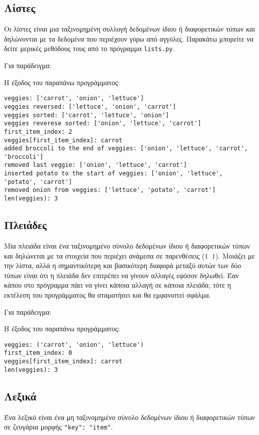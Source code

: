 \documentclass[14pt]{extreport}
\begin{document}
\subsection{Λίστες}
Οι λίστες είναι μια ταξινομημένη συλλογή δεδομένων ίδιου ή διαφορετικών τύπων και δηλώνονται με τα δεδομένα που περιέχουν γύρω από αγγύλες. Παρακάτω μπορείτε να δείτε μερικές μεθόδους τους από το πρόγραμμα \lstinline{lists.py}.

Για παράδειγμα:



Η έξοδος του παραπάνω προγράμματος:

\begin{lstlisting}[language={}]
veggies: ['carrot', 'onion', 'lettuce']
veggies reversed: ['lettuce', 'onion', 'carrot']
veggies sorted: ['carrot', 'lettuce', 'onion']
veggies reverese sorted: ['onion', 'lettuce', 'carrot']
first_item_index: 2
veggies[first_item_index]: carrot
added broccoli to the end of veggies: ['onion', 'lettuce', 'carrot', 'broccoli']
removed last veggie: ['onion', 'lettuce', 'carrot']
inserted potato to the start of veggies: ['onion', 'lettuce', 'potato', 'carrot']
removed onion from veggies: ['lettuce', 'potato', 'carrot']
len(veggies): 3
\end{lstlisting}

\subsection{Πλειάδες}
Μία πλειάδα είναι ένα ταξινομημένο σύνολο δεδομένων ίδιου ή διαφορετικών τύπων και δηλώνεται με τα στοιχεία που περιέχει ανάμεσα σε παρενθέσεις (\lstinline[language={}]{( )}). Μοιάζει με την λίστα, αλλά η σημαντικότερη και βασικότερη διαφορά μεταξύ αυτών των δύο τύπων είναι ότι η πλειάδα δεν επιτρέπει να γίνουν αλλαγές εφόσον δηλωθεί. Έαν κάπου στο πρόγραμμα πάει να γίνει κάποια αλλαγή σε κάποια πλειάδα, τότε η εκτέλεση του προγράμματος θα σταματήσει και θα εμφανιστεί σφάλμα.

Για παράδειγμα:



Η έξοδος του παραπάνω προγράμματος:

\begin{lstlisting}[language={}]
veggies: ('carrot', 'onion', 'lettuce')
first_item_index: 0
veggies[first_item_index]: carrot
len(veggies): 3
\end{lstlisting}



\newpage
\subsection{Λεξικά}
Ένα λεξικό είναι ένα μη ταξινομημένο σύνολο δεδομένων ίδιου ή διαφορετικών τύπων σε ζευγάρια μορφής \lstinline{"key": "item"}.
\end{document}
